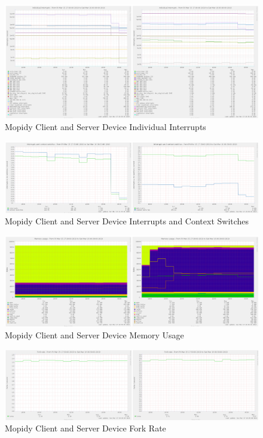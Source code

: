 \documentclass[11pt,a4paper,headinclude=false,footinclude=false]{scrreprt}
\begin{document}
\begin{figure}[H]
\includegraphics{ResultsAndAnalysis/MopidyServerTestImages/014MopidyIndividualInterrupts.png}
\centering
\caption{Mopidy Client and Server Device Individual Interrupts}
\label{MopidyIndInt}
\end{figure}

\begin{figure}[H]
\includegraphics{ResultsAndAnalysis/MopidyServerTestImages/015MopidyInterruptsAndContextSwitches.png}
\centering
\caption{Mopidy Client and Server Device Interrupts and Context Switches}
\label{MopidyIntCont}
\end{figure}

\begin{figure}[H]
\includegraphics{ResultsAndAnalysis/MopidyServerTestImages/017MopidyMemoryUsage.png}
\centering
\caption{Mopidy Client and Server Device Memory Usage}
\label{MopidyMemUse}
\end{figure}

\begin{figure}[H]
\includegraphics{ResultsAndAnalysis/MopidyServerTestImages/013MopidyForkRate.png}
\centering
\caption{Mopidy Client and Server Device Fork Rate}
\label{MopidyForkRate}
\end{figure}
\end{document}
